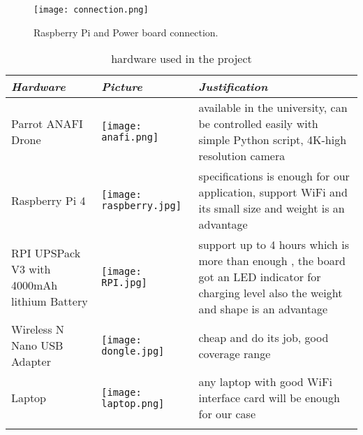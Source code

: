 \documentclass[../main.tex]{subfiles}
\begin{document}
\begin{figure}[H]
    \centering
    \texttt{[image: connection.png]}
    \caption{Raspberry Pi and Power board connection.}
    \label{fig:connection}
\end{figure} 
\begin{table}[H]
	\centering
	\caption{hardware used in the project}
	\label{tab:hardware-used}  
	\begin{tabular}{ p{4cm} p{3cm} p{6cm} }
		\toprule
		\textit{Hardware} & \textit{Picture} & \textit{Justification} \\ \midrule
		Parrot ANAFI Drone  & \begin{minipage}{.1\textwidth}
			\texttt{[image: anafi.png]}
		\end{minipage} & available in the university, can be controlled easily 
	   with simple Python script, 4K-high resolution camera  \\ \addlinespace
		Raspberry Pi 4  & \begin{minipage}{.0\textwidth}
			\texttt{[image: raspberry.jpg]}
		\end{minipage} & specifications is enough for our application, support WiFi and its small size and weight is an advantage\\ \addlinespace
		RPI UPSPack V3 with 4000mAh 
		lithium Battery  & \begin{minipage}{.1\textwidth}
			\texttt{[image: RPI.jpg]}
		\end{minipage}  & support up to 4 hours which is more than enough , the board got an LED indicator for charging level also the weight and shape is an advantage  \\ \addlinespace
		Wireless N Nano USB Adapter  & \begin{minipage}{.1\textwidth}
			\texttt{[image: dongle.jpg]}
		\end{minipage} & cheap and do its job, good coverage range  \\ \addlinespace
	   Laptop & \begin{minipage}{.1\textwidth}
			\texttt{[image: laptop.png]}
		\end{minipage} & any laptop with good WiFi interface card will be enough for our case \\ \addlinespace
		\bottomrule
	\end{tabular}
\end{table}    
\end{document}
